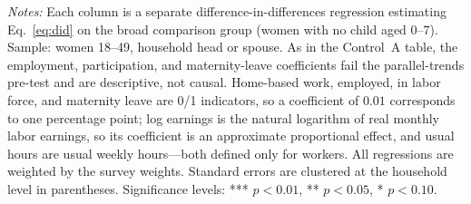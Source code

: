 \begin{table}[H]
   \par \raggedright 
   \footnotesize\textit{Notes:} Each column is a separate difference-in-differences regression estimating Eq.~\eqref{eq:did} on the broad comparison group (women with no child aged 0--7). Sample: women 18--49, household head or spouse. As in the Control~A table, the employment, participation, and maternity-leave coefficients fail the parallel-trends pre-test and are descriptive, not causal. Home-based work, employed, in labor force, and maternity leave are 0/1 indicators, so a coefficient of $0.01$ corresponds to one percentage point; log earnings is the natural logarithm of real monthly labor earnings, so its coefficient is an approximate proportional effect, and usual hours are usual weekly hours---both defined only for workers. All regressions are weighted by the survey weights. Standard errors are clustered at the household level in parentheses. Significance levels: *** $p<0.01$, ** $p<0.05$, * $p<0.10$.
\end{table}



